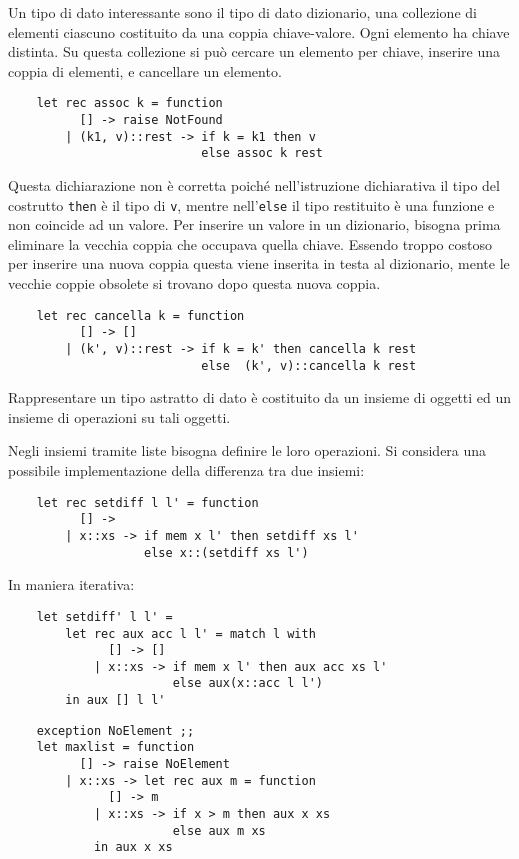 \documentclass{article}
\numberwithin{equation}{subsection}
\begin{document}
Un tipo di dato interessante sono il tipo di dato dizionario, una collezione di elementi ciascuno costituito da una coppia chiave-valore. Ogni elemento ha chiave distinta. 
Su questa collezione si può cercare un elemento per chiave, inserire una coppia di elementi, e cancellare un elemento. 
\begin{verbatim}
    let rec assoc k = function
          [] -> raise NotFound
        | (k1, v)::rest -> if k = k1 then v
                           else assoc k rest
\end{verbatim}
Questa dichiarazione non è corretta poiché nell'istruzione dichiarativa il tipo del costrutto \verb|then| è il tipo di \verb|v|, mentre nell'\verb|else| il tipo restituito è una funzione e non coincide ad un valore. 
Per inserire un valore in un dizionario, bisogna prima eliminare la vecchia coppia che occupava quella chiave. Essendo troppo costoso per inserire una nuova coppia questa viene inserita in testa al dizionario, mente le vecchie coppie obsolete si trovano dopo questa nuova coppia. 
\begin{verbatim}
    let rec cancella k = function
          [] -> []
        | (k', v)::rest -> if k = k' then cancella k rest
                           else  (k', v)::cancella k rest
\end{verbatim}



Rappresentare un tipo astratto di dato è costituito da un insieme di oggetti ed un insieme di operazioni su tali oggetti.  %




Negli insiemi tramite liste bisogna definire le loro operazioni. Si considera una possibile implementazione della differenza tra due insiemi:
\begin{verbatim}
    let rec setdiff l l' = function 
          [] -> 
        | x::xs -> if mem x l' then setdiff xs l'
                   else x::(setdiff xs l')
\end{verbatim}
In maniera iterativa:
\begin{verbatim}
    let setdiff' l l' = 
        let rec aux acc l l' = match l with
              [] -> []
            | x::xs -> if mem x l' then aux acc xs l'
                       else aux(x::acc l l')
        in aux [] l l'
\end{verbatim}



\begin{verbatim}
    exception NoElement ;; 
    let maxlist = function
          [] -> raise NoElement
        | x::xs -> let rec aux m = function
              [] -> m
            | x::xs -> if x > m then aux x xs
                       else aux m xs
            in aux x xs
\end{verbatim}
\end{document}
